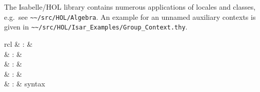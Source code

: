 \begin{isabellebody}
\begin{isamarkuptext}
  \medskip The Isabelle/HOL library contains numerous applications of
  locales and classes, e.g.\ see \verb|~~/src/HOL/Algebra|.  An
  example for an unnamed auxiliary contexts is given in \verb|~~/src/HOL/Isar_Examples/Group_Context.thy|.%
\end{isamarkuptext}%
\isamarkuptrue%
%
\isamarkuptrue%
%
\begin{isamarkuptext}%
\begin{matharray}{rcl}
    \hypertarget{command.bundle}{\hyperlink{command.bundle}{\mbox{}}} & : &  \\
    \hypertarget{command.print-bundles}{\hyperlink{command.print-bundles}{\mbox{}}} & : &  \\
    \hypertarget{command.include}{\hyperlink{command.include}{\mbox{}}} & : &  \\
    \hypertarget{command.including}{\hyperlink{command.including}{\mbox{}}} & : &  \\
    \hypertarget{keyword.includes}{\hyperlink{keyword.includes}{\mbox{}}} & : & syntax \\
  \end{matharray}


\end{isamarkuptext}
\end{isabellebody}
